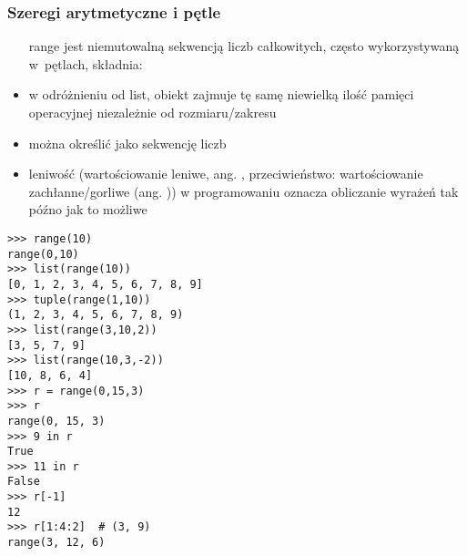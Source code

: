 \begin{frame}[fragile]
\frametitle{Szeregi arytmetyczne i pętle}

\hspace*{.03\textwidth}%
\begin{minipage}[t]{.57\textwidth}\vspace{0pt}
\begin{itemize}\small

 \item[range] jest niemutowalną sekwencją liczb całkowitych, często
 wykorzystywaną w~pętlach, składnia: \mbox{}

 \item w odróżnieniu od list, obiekt  zajmuje tę samę
 niewielką ilość pamięci operacyjnej niezależnie od rozmiaru/zakresu

 \item {} można określić jako  sekwencję liczb

 \item leniwość (wartościowanie leniwe, ang. ,
 przeciwieństwo: wartościowanie zachłanne/gorliwe (ang. )) w programowaniu oznacza obliczanie wyrażeń tak późno
 jak to możliwe

\end{itemize}
\end{minipage}\hfill%
\begin{minipage}[t]{.39\textwidth}\vspace{0pt}
\begin{Verbatim}[fontsize=\tiny,frame=single,label=\wgre{\bf range}]
>>> range(10)
range(0,10)
>>> list(range(10))
[0, 1, 2, 3, 4, 5, 6, 7, 8, 9]
>>> tuple(range(1,10))
(1, 2, 3, 4, 5, 6, 7, 8, 9)
>>> list(range(3,10,2))
[3, 5, 7, 9]
>>> list(range(10,3,-2))
[10, 8, 6, 4]
>>> r = range(0,15,3)
>>> r
range(0, 15, 3)
>>> 9 in r
True
>>> 11 in r
False
>>> r[-1]
12
>>> r[1:4:2]  # (3, 9)
range(3, 12, 6)
\end{Verbatim}

\end{minipage}
\end{frame}

